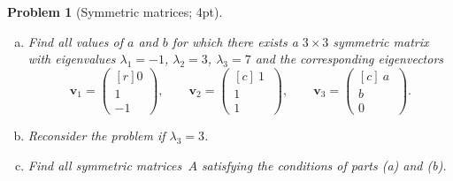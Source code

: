 \documentclass[12pt,a4]{article}
\newtheorem{problem}{Problem}
\newcommand{\bv}{{\mathbf v}}
\begin{document}
\begin{problem}[Symmetric matrices; 4pt]\rm
	\begin{enumerate}[(a)]
		\item Find all values of $a$ and $b$ for which there exists a $3\times3$ symmetric matrix with eigenvalues $\lambda_1=-1$, $\lambda_2=3$, $\lambda_3=7$ and the corresponding eigenvectors
		\[
		\bv_1 = \begin{pmatrix}[r] 0 \\ 1 \\ -1\end{pmatrix}, \qquad
		\bv_2 = \begin{pmatrix}[c] \ 1\  \\ 1 \\ 1 \end{pmatrix}, \qquad
		\bv_3 = \begin{pmatrix}[c] \ a\  \\ b \\ 0 \end{pmatrix}.
		\]
		\item Reconsider the problem if $\lambda_3 = 3$. 
		\item Find all symmetric matrices~$A$ satisfying the conditions of parts (a) and (b).
	\end{enumerate}
\end{problem}
\end{document}
